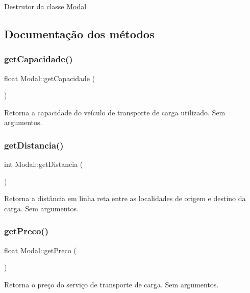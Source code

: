 Destrutor da classe \hyperlink{classModal}{Modal}

\subsection{Documentação dos métodos}
\mbox{\label{classModal_ac9750361d92b6ad91674851852c7362f}} 
\subsubsection{\texorpdfstring{get\+Capacidade()}{getCapacidade()}}
{\footnotesize\ttfamily float Modal\+::get\+Capacidade (\begin{DoxyParamCaption}{ }\end{DoxyParamCaption})}

Retorna a capacidade do veículo de transporte de carga utilizado. Sem argumentos.\mbox{\label{classModal_a1eedb4dfdddd81a5a7c7b3203e50e68c}} 
\subsubsection{\texorpdfstring{get\+Distancia()}{getDistancia()}}
{\footnotesize\ttfamily int Modal\+::get\+Distancia (\begin{DoxyParamCaption}{ }\end{DoxyParamCaption})}

Retorna a distância em linha reta entre as localidades de origem e destino da carga. Sem argumentos.\mbox{\label{classModal_ae124094018f5e049d5137a8eec893a79}} 
\subsubsection{\texorpdfstring{get\+Preco()}{getPreco()}}
{\footnotesize\ttfamily float Modal\+::get\+Preco (\begin{DoxyParamCaption}{ }\end{DoxyParamCaption})}

Retorna o preço do serviço de transporte de carga. Sem argumentos.\mbox{\label{classModal_ad0e185312cd36ad83b4e19fd1cd532be}} 
